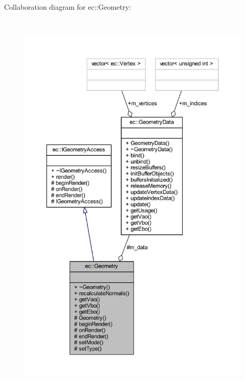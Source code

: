 Collaboration diagram for ec\+:\+:Geometry\+:\nopagebreak
\begin{figure}[H]
\begin{center}
\leavevmode
\includegraphics[height=550pt]{classec_1_1_geometry__coll__graph}
\end{center}
\end{figure}
